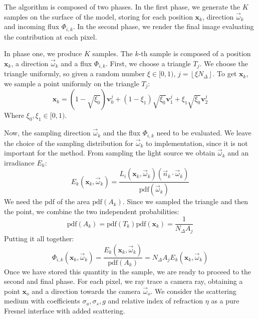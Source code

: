 \documentclass[10pt,a4paper]{article}
\begin{document}
The algorithm is composed of two phases. In the first phase, we generate the $K$ samples on the surface of the model, storing for each position $\mathbf{x}_k$, direction $\vec{\omega}_k$ and incoming flux $\Phi_{i,k}$. In the second phase, we render the final image evaluating the contribution at each pixel.

In phase one, we produce $K$ samples. The $k$-th  sample is composed of a position $\mathbf{x}_k$, a direction $\vec{\omega}_k$ and a flux $\Phi_{i,k}$. First, we choose a triangle $T_j$. We choose the triangle uniformly, so given a random number $\xi \in [0,1)$, $j = \left \lfloor{\xi N_\Delta}\right \rfloor$. To get $\mathbf{x}_k$, we sample a point uniformly on the triangle $T_j$:
\begin{equation*}
\mathbf{x}_k = (1 - \sqrt{\xi_0})\mathbf{v}^j_0 + (1 - {\xi_1})  \sqrt{\xi_0} \mathbf{v}^j_1 +  \xi_1\sqrt{\xi_0} \mathbf{v}^j_2
\end{equation*}
Where $\xi_0, \xi_1 \in [0,1)$. 

Now, the sampling direction $\vec{\omega}_k$ and the flux $\Phi_{i,k}$ need to be evaluated. We leave the choice of the sampling distribution for $\vec{\omega}_k$ to implementation, since it is not important for the method. From sampling the light source we obtain $\vec{\omega}_k$ and an irradiance $E_k$:
\begin{equation*}
E_k(\mathbf{x}_k, \vec{\omega}_k) = \frac{L_i(\mathbf{x}_k, \vec{\omega}_k) (\vec{n}_k \cdot \vec{\omega}_k)}{\text{pdf}(\vec{\omega}_k)}
\end{equation*}
We need the pdf of the area $\text{pdf}(A_k)$. Since we sampled the triangle and then the point, we combine the two independent probabilities:
\begin{equation*}
\text{pdf}(A_k) = \text{pdf}(T_k) \text{pdf}(\mathbf{x}_k) = \frac{1}{N_\Delta A_j} 
\end{equation*}
Putting it all together:
\begin{equation*}
\Phi_{i,k}(\mathbf{x}_k, \vec{\omega}_k)  = \frac{E_k(\mathbf{x}_k, \vec{\omega}_k) }{\text{pdf}(A_k)} = N_\Delta A_j E_k(\mathbf{x}_k, \vec{\omega}_k)
\end{equation*}
Once we have stored this quantity in the sample, we are ready to proceed to the second and final phase. For each pixel, we ray trace a camera ray, obtaining a point $\mathbf{x}_o$ and a direction towards the camera $\vec{\omega}_o$. We consider the scattering medium with coefficients $\sigma_a, \sigma_s, g$ and relative index of refraction $\eta$ as a pure Fresnel interface with added scattering. 
\end{document}
